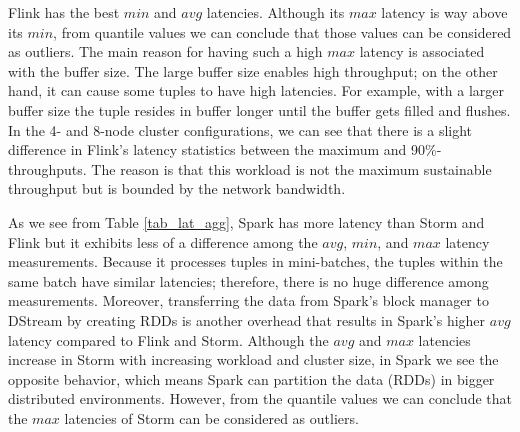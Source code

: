 Flink has the best $min$ and $avg$ latencies. Although its $max$ latency is way above its $min$, from quantile values we can conclude that those values can be considered as outliers. The main reason for having such a high $max$ latency is associated with the buffer size. The large buffer size enables high throughput; on the other hand, it can cause some tuples to have high latencies. For example, with a larger buffer size the tuple resides in buffer longer until the buffer gets filled and flushes. In the 4- and 8-node cluster configurations, we can see that there is a slight difference in Flink's latency statistics between  the maximum and 90\%-throughputs. The reason is that this workload is not the maximum sustainable throughput but is bounded by the network bandwidth. %
 
As we see from Table \ref{tab_lat_agg},  Spark has more latency than Storm and Flink but it exhibits less of a difference among the $avg$, $min$, and $max$ latency measurements. Because it processes tuples in mini-batches, the tuples within the same batch have similar latencies; therefore, there is no huge difference among measurements. Moreover, transferring the data from Spark's block manager to DStream by creating RDDs is another overhead that results in Spark's higher $avg$ latency compared to Flink and Storm.  Although the $avg$ and $max$ latencies increase in Storm with increasing workload and cluster size, in Spark we see the opposite behavior, which means Spark can partition the data (RDDs) in bigger distributed environments. However, from the quantile values we can conclude that the $max$ latencies of Storm  can be considered as outliers.






















